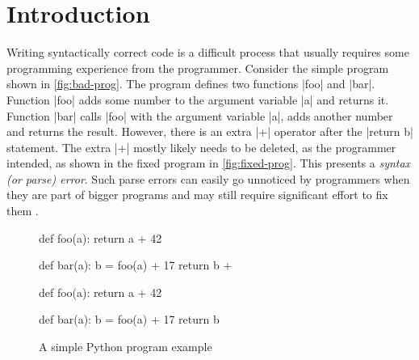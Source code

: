 \section{Introduction}
\label{sec:intro}

Writing syntactically correct code is a difficult process that usually requires
some programming experience from the programmer. Consider the simple program
shown in \autoref{fig:bad-prog}. The program defines two functions |foo| and
|bar|. Function |foo| adds some number to the argument variable |a| and returns
it. Function |bar| calls |foo| with the argument variable |a|, adds another
number and returns the result. However, there is an extra |+| operator after the
|return b| statement. The extra |+| mostly likely needs to be deleted, as the
programmer intended, as shown in the fixed program in \autoref{fig:fixed-prog}.
This presents a \emph{syntax (or parse) error}. Such parse errors can easily go
unnoticed \citep{Denny_2012, Ahadi_2018, VanDerSpek_2005} by programmers when
they are part of bigger programs and may still require significant effort to fix
them \citep{Kummerfeld2003}.


\begin{figure}[h]
\centering
\begin{minipage}[c]{0.48\linewidth}
\begin{ecode}
def foo(a):
  return a + 42

def bar(a):
  b = foo(a) + 17
  return b +
\end{ecode}
\label{fig:bad-prog}
\end{minipage}%
\hspace{0.02\linewidth}%
\begin{minipage}[c]{0.48\linewidth}
\begin{ecode}
def foo(a):
  return a + 42

def bar(a):
  b = foo(a) + 17
  return b
\end{ecode}
\label{fig:fixed-prog}
\end{minipage}
\caption{A simple Python program example}
\label{fig:example-prog}
\end{figure}

